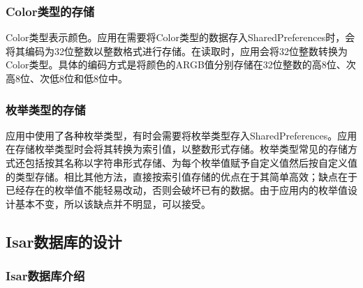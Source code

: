 \subsubsection{Color类型的存储}\label{subsubsec:color-storage}

Color类型表示颜色。应用在需要将Color类型的数据存入SharedPreferences时，会将其编码为32位整数以整数格式进行存储。在读取时，应用会将32位整数转换为Color类型。具体的编码方式是将颜色的ARGB值分别存储在32位整数的高8位、次高8位、次低8位和低8位中。

\subsubsection{枚举类型的存储}\label{subsubsec:enum-storage}

应用中使用了各种枚举类型，有时会需要将枚举类型存入SharedPreferences。应用在存储枚举类型时会将其转换为索引值，以整数形式存储。枚举类型常见的存储方式还包括按其名称以字符串形式存储、为每个枚举值赋予自定义值然后按自定义值的类型存储。相比其他方法，直接按索引值存储的优点在于其简单高效；缺点在于已经存在的枚举值不能轻易改动，否则会破坏已有的数据。由于应用内的枚举值设计基本不变，所以该缺点并不明显，可以接受。

\subsection{Isar数据库的设计}\label{subsec:isar}

\subsubsection{Isar数据库介绍}\label{subsubsec:isar-intro}
